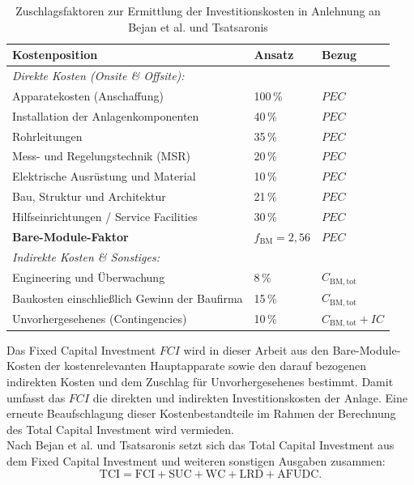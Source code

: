 \begin{table}[H]
\centering
\caption{Zuschlagsfaktoren zur Ermittlung der Investitionskosten in Anlehnung an Bejan et al. und Tsatsaronis \cite{bejan_thermal_1996}}
\label{tab:zuschlagsfaktoren_detailliert}
\begin{tabular}{lll}
\hline
\textbf{Kostenposition} & \textbf{Ansatz} & \textbf{Bezug} \\
\hline
\textit{Direkte Kosten (Onsite \& Offsite):} & & \\
Apparatekosten (Anschaffung) & 100\,\% & $PEC$ \\
Installation der Anlagenkomponenten & 40\,\% & $PEC$ \\
Rohrleitungen & 35\,\% & $PEC$ \\
Mess- und Regelungstechnik (MSR) & 20\,\% & $PEC$ \\
Elektrische Ausrüstung und Material & 10\,\% & $PEC$ \\
Bau, Struktur und Architektur & 21\,\% & $PEC$ \\
Hilfseinrichtungen / Service Facilities & 30\,\% & $PEC$ \\
\hline
\textbf{Bare-Module-Faktor} & $f_\mathrm{BM}=2{,}56$ & $PEC$ \\
\hline
\textit{Indirekte Kosten \& Sonstiges:} & & \\
Engineering und Überwachung & 8\,\% & $C_\mathrm{BM,tot}$ \\
Baukosten einschließlich Gewinn der Baufirma & 15\,\% & $C_\mathrm{BM,tot}$ \\
Unvorhergesehenes (Contingencies) & 10\,\% & $C_\mathrm{BM,tot}+IC$ \\
\hline
\end{tabular}
\end{table} 
\noindent
Das Fixed Capital Investment \(FCI\) wird in dieser Arbeit aus den
Bare-Module-Kosten der kostenrelevanten Hauptapparate sowie den darauf
bezogenen indirekten Kosten und dem Zuschlag für Unvorhergesehenes bestimmt.
Damit umfasst das \(FCI\) die direkten und indirekten Investitionskosten der
Anlage. Eine erneute Beaufschlagung dieser Kostenbestandteile im Rahmen der
Berechnung des Total Capital Investment wird vermieden.\\
Nach Bejan et al. und Tsatsaronis setzt sich das Total Capital Investment
aus dem Fixed Capital Investment und weiteren sonstigen Ausgaben zusammen:
\begin{equation}
\mathrm{TCI} = \mathrm{FCI} + \mathrm{SUC} + \mathrm{WC} + \mathrm{LRD} + \mathrm{AFUDC}.
\end{equation}
